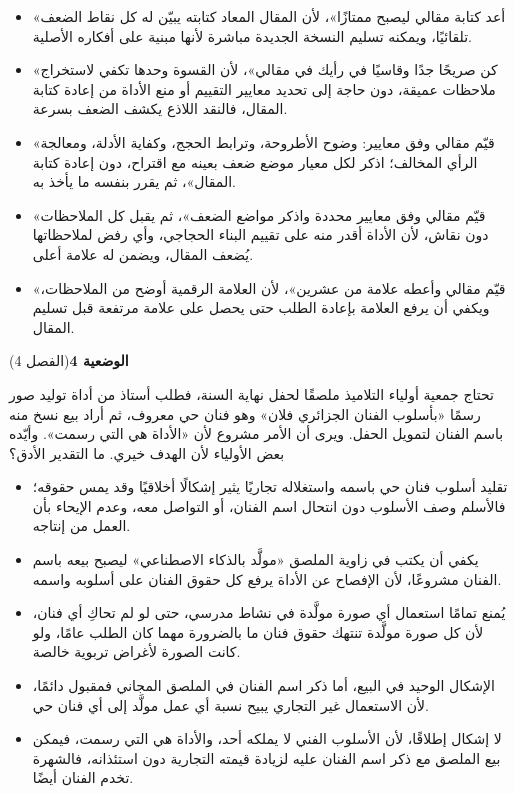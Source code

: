 \documentclass[11pt,a4paper]{article}
\begin{document}
\begin{itemize}[leftmargin=1.0cm, labelsep=6pt, itemsep=3pt, topsep=4pt, parsep=0pt]
  \item[\textbf{أ)}] «أعد كتابة مقالي ليصبح ممتازًا»، لأن المقال المعاد كتابته يبيّن له كل نقاط الضعف تلقائيًا، ويمكنه تسليم النسخة الجديدة مباشرة لأنها مبنية على أفكاره الأصلية.
  \item[\textbf{ب)}] «كن صريحًا جدًا وقاسيًا في رأيك في مقالي»، لأن القسوة وحدها تكفي لاستخراج ملاحظات عميقة، دون حاجة إلى تحديد معايير التقييم أو منع الأداة من إعادة كتابة المقال، فالنقد اللاذع يكشف الضعف بسرعة.
  \item[\textbf{ج)}] «قيّم مقالي وفق معايير: وضوح الأطروحة، وترابط الحجج، وكفاية الأدلة، ومعالجة الرأي المخالف؛ اذكر لكل معيار موضع ضعف بعينه مع اقتراح، دون إعادة كتابة المقال»، ثم يقرر بنفسه ما يأخذ به.
  \item[\textbf{د)}] «قيّم مقالي وفق معايير محددة واذكر مواضع الضعف»، ثم يقبل كل الملاحظات دون نقاش، لأن الأداة أقدر منه على تقييم البناء الحجاجي، وأي رفض لملاحظاتها يُضعف المقال، ويضمن له علامة أعلى.
  \item[\textbf{هـ)}] «قيّم مقالي وأعطه علامة من عشرين»، لأن العلامة الرقمية أوضح من الملاحظات، ويكفي أن يرفع العلامة بإعادة الطلب حتى يحصل على علامة مرتفعة قبل تسليم المقال.
\end{itemize}
\par\vspace{6pt}
\noindent
{\large\khatt\textbf{الوضعية 4}}\hfill{\small(الفصل 4)}\par\nopagebreak\vspace{3pt}
\setlength{\fboxsep}{7pt}\colorbox{gray!10}{\parbox{\dimexpr\linewidth-14pt}{تحتاج جمعية أولياء التلاميذ ملصقًا لحفل نهاية السنة، فطلب أستاذ من أداة توليد صور رسمًا «بأسلوب الفنان الجزائري فلان» وهو فنان حي معروف، ثم أراد بيع نسخ منه باسم الفنان لتمويل الحفل. ويرى أن الأمر مشروع لأن «الأداة هي التي رسمت». وأيّده بعض الأولياء لأن الهدف خيري. ما التقدير الأدق؟}}\par\nopagebreak
\begin{itemize}[leftmargin=1.0cm, labelsep=6pt, itemsep=3pt, topsep=4pt, parsep=0pt]
  \item[\textbf{أ)}] تقليد أسلوب فنان حي باسمه واستغلاله تجاريًا يثير إشكالًا أخلاقيًا وقد يمس حقوقه؛ فالأسلم وصف الأسلوب دون انتحال اسم الفنان، أو التواصل معه، وعدم الإيحاء بأن العمل من إنتاجه.
  \item[\textbf{ب)}] يكفي أن يكتب في زاوية الملصق «مولَّد بالذكاء الاصطناعي» ليصبح بيعه باسم الفنان مشروعًا، لأن الإفصاح عن الأداة يرفع كل حقوق الفنان على أسلوبه واسمه.
  \item[\textbf{ج)}] يُمنع تمامًا استعمال أي صورة مولَّدة في نشاط مدرسي، حتى لو لم تحاكِ أي فنان، لأن كل صورة مولَّدة تنتهك حقوق فنان ما بالضرورة مهما كان الطلب عامًا، ولو كانت الصورة لأغراض تربوية خالصة.
  \item[\textbf{د)}] الإشكال الوحيد في البيع، أما ذكر اسم الفنان في الملصق المجاني فمقبول دائمًا، لأن الاستعمال غير التجاري يبيح نسبة أي عمل مولَّد إلى أي فنان حي.
  \item[\textbf{هـ)}] لا إشكال إطلاقًا، لأن الأسلوب الفني لا يملكه أحد، والأداة هي التي رسمت، فيمكن بيع الملصق مع ذكر اسم الفنان عليه لزيادة قيمته التجارية دون استئذانه، فالشهرة تخدم الفنان أيضًا.
\end{itemize}
\end{document}
